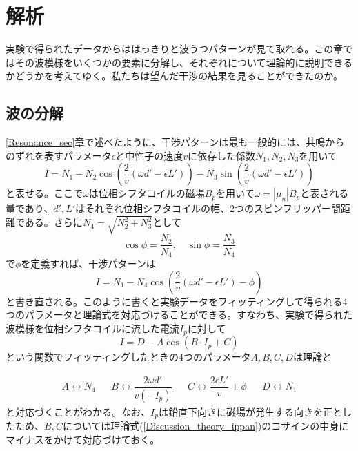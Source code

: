 \section{解析}
実験で得られたデータからははっきりと波うつパターンが見て取れる。この章ではその波模様をいくつかの要素に分解し、それぞれについて理論的に説明できるかどうかを考えてゆく。私たちは望んだ干渉の結果を見ることができたのか。

\subsection{波の分解}

\ref{Resonance_sec}章で述べたように、干渉パターンは最も一般的には、共鳴からのずれを表すパラメータ$\epsilon$と中性子の速度$v$に依存した係数$N_1,N_2,N_3$を用いて
\begin{equation}
I=N_1-N_2\cos\left(\frac{2}{v}(\omega d'-\epsilon L')\right) -N_3\sin\left(\frac{2}{v}(\omega d'-\epsilon L')\right) \label{Discussion_theory_ippan}
\end{equation}
と表せる。ここで$\omega$は位相シフタコイルの磁場$B_p$を用いて$\omega=|\mu_n|B_p$と表される量であり、$d',L'$はそれぞれ位相シフタコイルの幅、2つのスピンフリッパー間距離である。さらに$N_4=\sqrt{N_2^2+N_3^2}$として
\begin{equation}
\cos \phi=\frac{N_2}{N_4}, \quad \sin \phi=\frac{N_3}{N_4}
\end{equation}
で$\phi$を定義すれば、干渉パターンは
\begin{equation}
I=N_1-N_4\cos\left(\frac{2}{v}(\omega d'-\epsilon L')-\phi\right)\label{Discussion_theory_ippan2}
\end{equation}
と書き直される。このように書くと実験データをフィッティングして得られる4つのパラメータと理論式を対応づけることができる。すなわち、実験で得られた波模様を位相シフタコイルに流した電流$I_p$に対して
\begin{equation}
I=D-A\cos(B\cdot I_p+C)
\end{equation}
という関数でフィッティングしたときの4つのパラメータ$A,B,C,D$は理論と

\begin{align}
A \leftrightarrow N_4&&B \leftrightarrow \dfrac{2\omega d'}{v(-I_p)}&&C \leftrightarrow \dfrac{2\epsilon L'}{v} +\phi&&D \leftrightarrow N_1
\end{align}
と対応づくことがわかる。なお、$I_p$は鉛直下向きに磁場が発生する向きを正としたため、$B,C$については理論式(\ref{Discussion_theory_ippan})のコサインの中身にマイナスをかけて対応づけておく。

